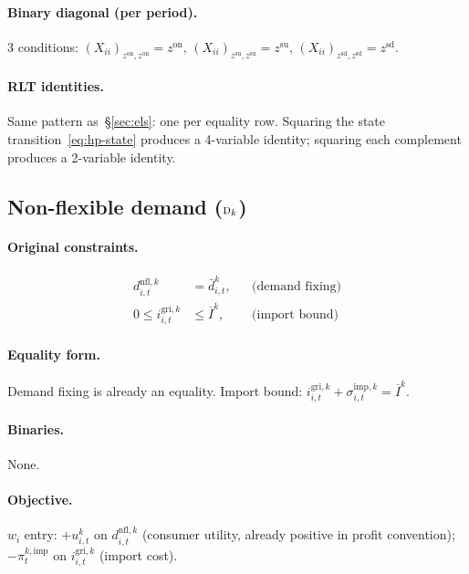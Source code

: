\documentclass[11pt]{article}
\theoremstyle{definition}
\begin{document}
\paragraph{Binary diagonal (per period).}
3 conditions: $(X_{ii})_{z^{\mathrm{on}},z^{\mathrm{on}}}=z^{\mathrm{on}}$,
$(X_{ii})_{z^{\mathrm{su}},z^{\mathrm{su}}}=z^{\mathrm{su}}$,
$(X_{ii})_{z^{\mathrm{sd}},z^{\mathrm{sd}}}=z^{\mathrm{sd}}$.

\paragraph{RLT identities.}
Same pattern as~\S\ref{sec:els}: one per equality row.  Squaring the
state transition~\eqref{eq:hp-state} produces a 4-variable identity;
squaring each complement produces a 2-variable identity.

\subsection{Non-flexible demand (\texorpdfstring{$\textsc{d}_k$}{D\_k})}
\label{sec:demand}

\paragraph{Original constraints.}
\begin{align}
d^{\mathrm{nfl},k}_{i,t}&=\bar d^{k}_{i,t},
  &&\text{(demand fixing)}\label{eq:demand-fix}\\
0\le i^{\mathrm{gri},k}_{i,t}&\le\overline{I}^{k},
  &&\text{(import bound)}\label{eq:demand-import}
\end{align}

\paragraph{Equality form.}
Demand fixing is already an equality.  Import bound:
$i^{\mathrm{gri},k}_{i,t}+\sigma^{\mathrm{imp},k}_{i,t}
=\overline{I}^{k}$.

\paragraph{Binaries.} None.

\paragraph{Objective.}
$w_i$ entry: $+u^{k}_{i,t}$ on $d^{\mathrm{nfl},k}_{i,t}$ (consumer
utility, already positive in profit convention);
$-\pi^{k,\mathrm{imp}}_t$ on $i^{\mathrm{gri},k}_{i,t}$ (import cost).
\end{document}
